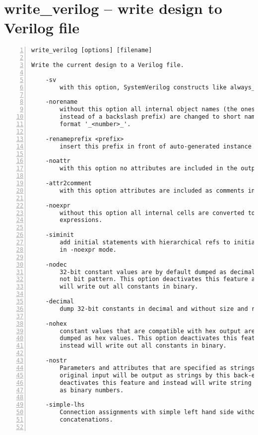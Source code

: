 \section{write\_verilog -- write design to Verilog file}
\label{cmd:write_verilog}
\begin{lstlisting}[numbers=left,frame=single]
    write_verilog [options] [filename]

Write the current design to a Verilog file.

    -sv
        with this option, SystemVerilog constructs like always_comb are used

    -norename
        without this option all internal object names (the ones with a dollar
        instead of a backslash prefix) are changed to short names in the
        format '_<number>_'.

    -renameprefix <prefix>
        insert this prefix in front of auto-generated instance names

    -noattr
        with this option no attributes are included in the output

    -attr2comment
        with this option attributes are included as comments in the output

    -noexpr
        without this option all internal cells are converted to Verilog
        expressions.

    -siminit
        add initial statements with hierarchical refs to initialize FFs when
        in -noexpr mode.

    -nodec
        32-bit constant values are by default dumped as decimal numbers,
        not bit pattern. This option deactivates this feature and instead
        will write out all constants in binary.

    -decimal
        dump 32-bit constants in decimal and without size and radix

    -nohex
        constant values that are compatible with hex output are usually
        dumped as hex values. This option deactivates this feature and
        instead will write out all constants in binary.

    -nostr
        Parameters and attributes that are specified as strings in the
        original input will be output as strings by this back-end. This
        deactivates this feature and instead will write string constants
        as binary numbers.

    -simple-lhs
        Connection assignments with simple left hand side without
        concatenations.


\end{lstlisting}

